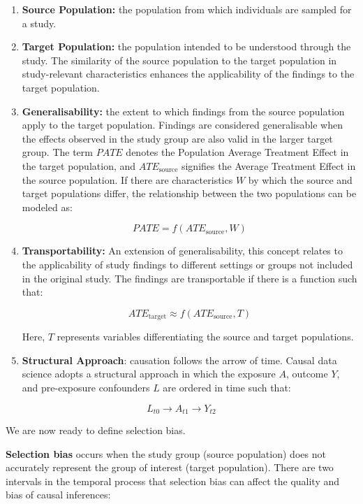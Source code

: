 \documentclass[
  singlecolumn,
  9pt]{article}
\begin{document}
\begin{enumerate}
\def\labelenumi{\arabic{enumi}.}
\item
  \textbf{Source Population:} the population from which individuals are
  sampled for a study.
\item
  \textbf{Target Population:} the population intended to be understood
  through the study. The similarity of the source population to the
  target population in study-relevant characteristics enhances the
  applicability of the findings to the target population.
\item
  \textbf{Generalisability:} the extent to which findings from the
  source population apply to the target population. Findings are
  considered generalisable when the effects observed in the study group
  are also valid in the larger target group. The term \(PATE\) denotes
  the Population Average Treatment Effect in the target population, and
  \(ATE_{\text{source}}\) signifies the Average Treatment Effect in the
  source population. If there are characteristics \(W\) by which the
  source and target populations differ, the relationship between the two
  populations can be modeled as:

  \[PATE = f(ATE_{\text{source}}, W)\]
\item
  \textbf{Transportability:} An extension of generalisability, this
  concept relates to the applicability of study findings to different
  settings or groups not included in the original study. The findings
  are transportable if there is a function such that:

  \[ATE_{\text{target}} \approx f(ATE_{\text{source}}, T)\]

  Here, \(T\) represents variables differentiating the source and target
  populations.
\item
  \textbf{Structural Approach}: causation follows the arrow of time.
  Causal data science adopts a structural approach in which the exposure
  \(A\), outcome \(Y\), and pre-exposure confounders \(L\) are ordered
  in time such that:
\end{enumerate}

\[
L_{t0}\to A_{t1} \to Y_{t2}
\]

We are now ready to define selection bias.

\textbf{Selection bias} occurs when the study group (source population)
does not accurately represent the group of interest (target population).
There are two intervals in the temporal process that selection bias can
affect the quality and bias of causal inferences:
\end{document}
